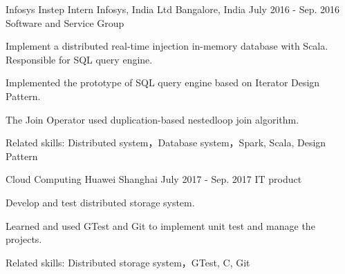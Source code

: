 \begin{cventries}
  \cventry
    {Infosys Instep Intern}
    {Infosys, India Ltd}
    {Bangalore, India}
    {July 2016 - Sep. 2016}
    {Software and Service Group}
    {
      \begin{cvitems}
        \item {Implement a distributed real-time injection in-memory database with Scala. Responsible for SQL query engine.}
        \item {Implemented the prototype of SQL query engine based on Iterator Design Pattern.}
        \item {The Join Operator used duplication-based nestedloop join algorithm.}
        \item {Related skills: Distributed system，Database system，Spark, Scala, Design Pattern}
      \end{cvitems}
    }
  \cventry
    {Cloud Computing}
    {Huawei}
    {Shanghai}
    {July 2017 - Sep. 2017}
    {IT product}
    {
      \begin{cvitems}
        \item {Develop and test distributed storage system.}
        \item {Learned and used GTest and Git to implement unit test and manage the projects.}
        \item {Related skills: Distributed storage system，GTest, C, Git}
      \end{cvitems} 
    }
\end{cventries}
